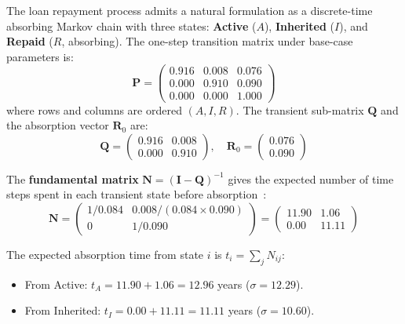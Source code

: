 \documentclass[11pt, letterpaper]{article}
\begin{document}
The loan repayment process admits a natural formulation as a discrete-time absorbing Markov chain with three states: \textbf{Active} ($A$), \textbf{Inherited} ($I$), and \textbf{Repaid} ($R$, absorbing). The one-step transition matrix under base-case parameters is:
\begin{equation}
  \mathbf{P} =
  \begin{pmatrix}
    0.916 & 0.008 & 0.076 \\
    0.000 & 0.910 & 0.090 \\
    0.000 & 0.000 & 1.000
  \end{pmatrix}
  \label{eq:transition_matrix}
\end{equation}
where rows and columns are ordered $(A, I, R)$. The transient sub-matrix $\mathbf{Q}$ and the absorption vector $\mathbf{R}_0$ are:
\begin{equation}
  \mathbf{Q} =
  \begin{pmatrix} 0.916 & 0.008 \\ 0.000 & 0.910
  \end{pmatrix}, \quad
  \mathbf{R}_0 =
  \begin{pmatrix} 0.076 \\ 0.090
  \end{pmatrix}
\end{equation}

The \textbf{fundamental matrix} $\mathbf{N} = (\mathbf{I} - \mathbf{Q})^{-1}$ gives the expected number of time steps spent in each transient state before absorption~\cite{kemeny1960}:
\begin{equation}
  \mathbf{N} =
  \begin{pmatrix} 1/0.084 & 0.008/(0.084 \times 0.090) \\ 0 & 1/0.090
  \end{pmatrix}
  =
  \begin{pmatrix} 11.90 & 1.06 \\ 0.00 & 11.11
  \end{pmatrix}
\end{equation}

The expected absorption time from state $i$ is $t_i = \sum_j N_{ij}$:
\begin{itemize}[nosep]
  \item From Active: $t_A = 11.90 + 1.06 = \mathbf{12.96}$ years ($\sigma = 12.29$).
  \item From Inherited: $t_I = 0.00 + 11.11 = \mathbf{11.11}$ years ($\sigma = 10.60$).
\end{itemize}
\end{document}
